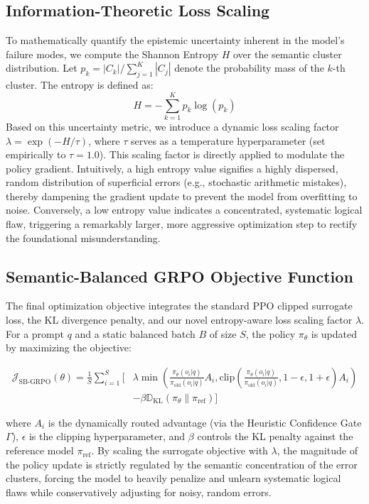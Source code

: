 \subsection{Information-Theoretic Loss Scaling}\label{subsec:info-theoretic-loss}
To mathematically quantify the epistemic uncertainty inherent in the model's failure modes, we compute the Shannon Entropy $H$ over the semantic cluster distribution. Let $p_k = |C_k| / \sum_{j=1}^K |C_j|$ denote the probability mass of the $k$-th cluster. The entropy is defined as:
\begin{equation}
H = - \sum_{k=1}^K p_k \log(p_k)
\end{equation}
Based on this uncertainty metric, we introduce a dynamic loss scaling factor $\lambda = \exp(-H/\tau)$, where $\tau$ serves as a temperature hyperparameter (set empirically to $\tau=1.0$). This scaling factor is directly applied to modulate the policy gradient. Intuitively, a high entropy value signifies a highly dispersed, random distribution of superficial errors (e.g., stochastic arithmetic mistakes), thereby dampening the gradient update to prevent the model from overfitting to noise. Conversely, a low entropy value indicates a concentrated, systematic logical flaw, triggering a remarkably larger, more aggressive optimization step to rectify the foundational misunderstanding.

\subsection{Semantic-Balanced GRPO Objective Function}
The final optimization objective integrates the standard PPO clipped surrogate loss, the KL divergence penalty, and our novel entropy-aware loss scaling factor $\lambda$. For a prompt $q$ and a static balanced batch $B$ of size $S$, the policy $\pi_\theta$ is updated by maximizing the objective:

\begin{equation}
\begin{aligned}
\mathcal{J}_{\text{SB-GRPO}}(\theta) = \frac{1}{S} \sum_{i=1}^{S} \Bigg[ &\lambda \min \left( \frac{\pi_\theta(o_i|q)}{\pi_{\text{old}}(o_i|q)} A_i, \text{clip}\left(\frac{\pi_\theta(o_i|q)}{\pi_{\text{old}}(o_i|q)}, 1-\epsilon, 1+\epsilon\right) A_i \right) \\
&- \beta \mathbb{D}_{\text{KL}}(\pi_\theta \| \pi_{\text{ref}}) \Bigg]
\end{aligned}
\end{equation}

where $A_i$ is the dynamically routed advantage (via the Heuristic Confidence Gate $\Gamma$), $\epsilon$ is the clipping hyperparameter, and $\beta$ controls the KL penalty against the reference model $\pi_{\text{ref}}$. By scaling the surrogate objective with $\lambda$, the magnitude of the policy update is strictly regulated by the semantic concentration of the error clusters, forcing the model to heavily penalize and unlearn systematic logical flaws while conservatively adjusting for noisy, random errors.

